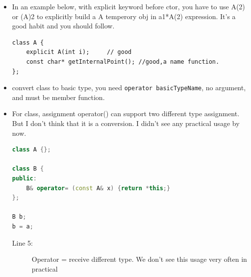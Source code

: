 \documentclass[a4paper,11pt,twoside]{book}
\begin{document}
\begin{itemize}
	\item In an example below, with explicit keyword before ctor,  you have to use A(2) or (A)2 to explicitly build a A temperory obj in a1*A(2) expression. It's a good habit and you should follow. 
\begin{lstlisting}[numbers=none]
class A {
	explicit A(int i);     // good
	const char* getInternalPoint(); //good,a name function.
};
\end{lstlisting}
	
	\item  convert class to basic type, you need \texttt{operator basicTypeName}, no argument, and must be member function.
	
	\item For class, assignment operator() can support two different type assignment. But I don't think that it is a conversion. I didn't see any practical usage by now. 
\begin{lstlisting}[frame=single, language=c++]
class A {};
	
class B {
public:
	B& operator= (const A& x) {return *this;}
};
	
B b;
b = a; 
\end{lstlisting}
\begin{description}
	\item[Line 5:] Operator = receive different type. We don't see this usage very often in practical 
\end{description}
\end{itemize}
\end{document}
